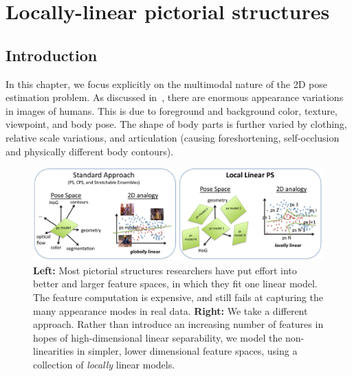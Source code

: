 \chapter{Locally-linear pictorial structures}\label{sec:llps}
\section{Introduction}

In this chapter, we focus explicitly on the multimodal nature of the 2D pose 
estimation problem.  As discussed in~, there are enormous 
appearance variations in images of humans.  This is due to foreground and 
background color, texture, viewpoint, and body pose.  The shape of body parts 
is further varied by clothing, relative scale variations, and articulation 
(causing foreshortening, self-occlusion and physically different body 
contours).

\begin{figure}[t!]
\centering
\includegraphics[width=0.99\linewidth]{figs/llps-overview.pdf}
\caption[LLPS overview.]{\label{fig:overview} \textbf{Left:} Most pictorial 
structures researchers have put effort into better and larger feature spaces, 
in which they fit one linear model.  The feature computation is expensive, and
still fails at capturing the many appearance modes in real data.  
\textbf{Right:} We take a different approach.  Rather than introduce an 
increasing number of features in hopes of high-dimensional linear separability, 
we model the non-linearities in simpler, lower dimensional feature spaces, 
using a collection of {\em locally} linear models.}
\end{figure}


